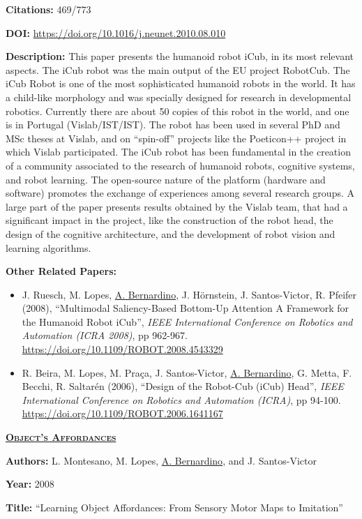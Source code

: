 \documentclass[
]{article}
\begin{document}
\textbf{Citations:} 469/773

\textbf{DOI:} \url{https://doi.org/10.1016/j.neunet.2010.08.010}

\textbf{Description:} This paper presents the humanoid robot iCub, in
its most relevant aspects. The iCub robot was the main output of the EU
project RobotCub. The iCub Robot is one of the most sophisticated
humanoid robots in the world. It has a child-like morphology and was
specially designed for research in developmental robotics. Currently
there are about 50 copies of this robot in the world, and one is in
Portugal (Vislab/IST/IST). The robot has been used in several PhD and
MSc theses at Vislab, and on ``spin-off'' projects like the Poeticon++
project in which Vislab participated. The iCub robot has been
fundamental in the creation of a community associated to the research of
humanoid robots, cognitive systems, and robot learning. The open-source
nature of the platform (hardware and software) promotes the exchange of
experiences among several research groups. A large part of the paper
presents results obtained by the Vislab team, that had a significant
impact in the project, like the construction of the robot head, the
design of the cognitive architecture, and the development of robot
vision and learning algorithms.

\textbf{Other Related Papers:}

\begin{itemize}
\item
  J. Ruesch, M. Lopes, \ul{A. Bernardino}, J. Hörnstein, J.
  Santos-Victor, R. Pfeifer (2008), ``Multimodal Saliency-Based
  Bottom-Up Attention A Framework for the Humanoid Robot iCub'',
  \emph{IEEE International Conference on Robotics and Automation (ICRA
  2008)}, pp 962-967. \url{https://doi.org/10.1109/ROBOT.2008.4543329}
\item
  R. Beira, M. Lopes, M. Praça, J. Santos-Victor, \ul{A. Bernardino}, G.
  Metta, F. Becchi, R. Saltarén (2006), ``Design of the Robot-Cub (iCub)
  Head'', \emph{IEEE International Conference on Robotics and Automation
  (ICRA)}, pp 94-100. \url{https://doi.org/10.1109/ROBOT.2006.1641167}
\end{itemize}

\textbf{\textsc{\ul{Object's Affordances}}}

\textbf{Authors:} L. Montesano, M. Lopes, \ul{A. Bernardino}, and J.
Santos-Victor

\textbf{Year:} 2008

\textbf{Title:} ``Learning Object Affordances: From Sensory Motor Maps
to Imitation''
\end{document}
